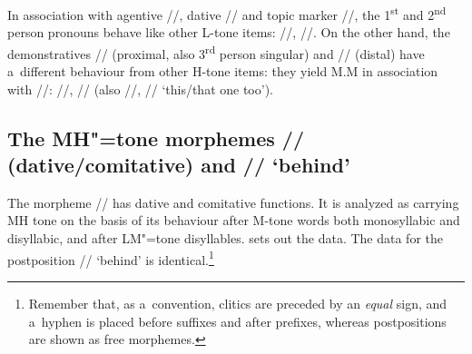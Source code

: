 \newpage 
In association with {agentive} //, {dative} // and {topic} marker
//, the 1\textsuperscript{st} and 2\textsuperscript{nd} person pronouns behave like other L-tone items:
//, //. On the other hand, the demonstratives // (proximal, also 3\textsuperscript{rd} person singular) and
// (distal) have a~different behaviour from other H-tone items: they yield M.M in
association with //: //, // (also //,
// ‘this/that one too’). 

\subsection[MH"=tone morphemes]{The MH"=tone morphemes // (dative/comitative) and // ‘behind’}
\label{sec:mhtoneenclitics}

The morpheme // has dative and comitative functions. It is analyzed as carrying MH tone on the
basis of its behaviour after M-tone words both {monosyllabic} and disyllabic, and after LM"=tone
disyllables.  sets out the data. 
The data for the postposition //
‘behind’ is identical.\footnote{Remember that, as a~convention, clitics are preceded by an \textit{equal} sign, and a~hyphen is placed before suffixes and after prefixes, whereas postpositions are shown as free morphemes.}

